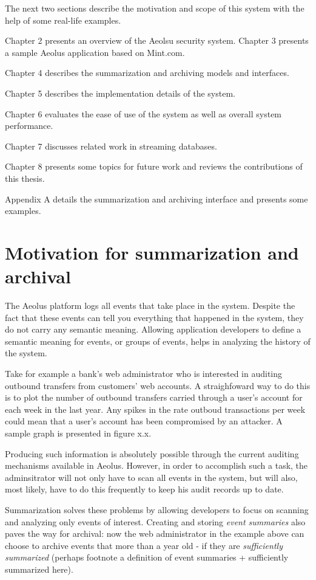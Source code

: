 The next two sections describe the motivation and scope of this system with the help of some real-life examples.

Chapter 2 presents an overview of the Aeolsu security system. Chapter 3 presents a sample Aeolus application based on Mint.com.

Chapter 4 describes the summarization and archiving models and interfaces.

Chapter 5 describes the implementation details of the system.

Chapter 6 evaluates the ease of use of the system as well as overall system performance.

Chapter 7 discusses related work in streaming databases.

Chapter 8 presents some topics for future work and reviews the contributions of this thesis.

Appendix A details the summarization and archiving interface and presents some examples.


\section{Motivation for summarization and archival}

The Aeolus platform logs all events that take place in the system. Despite the fact that these events can tell you everything that happened in the system, they do not carry any semantic meaning. Allowing application developers to define a semantic meaning for events, or groups of events, helps in analyzing the history of the system.

Take for example a bank's web administrator who is interested in auditing outbound transfers from customers' web accounts. A straighfoward way to do this is to plot the number of outbound transfers carried through a user's account for each week in the last year. Any spikes in the rate outboud transactions per week could mean that a user's account has been compromised by an attacker. A sample graph is presented in figure x.x.

Producing such information is absolutely possible through the current auditing mechanisms available in Aeolus. However, in order to accomplish such a task, the adminsitrator will not only have to scan all events in the system, but will also, most likely, have to do this frequently to keep his audit records up to date.

Summarization solves these problems by allowing developers to focus on scanning and analyzing only events of interest. Creating and storing \emph{event summaries} also paves the way for archival: now the web administrator in the example above can choose to archive events that more than a year old - if they are \emph{sufficiently summarized} (perhaps footnote a definition of event summaries + sufficiently summarized here).

